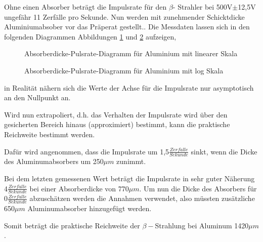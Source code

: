 Ohne einen Absorber beträgt die Impulsrate für den $\beta$- Strahler
bei 500V$\pm$12,5V ungefähr 11 Zerfälle pro Sekunde. Nun werden mit
zunehmender Schicktdicke Aluminiumabsober vor das Präperat gestellt..
Die Messdaten lassen sich in den folgenden Diagrammen Abbildungen \ref{fig:alu_lin} und \ref{fig:alu_log} aufzeigen,

\begin{figure}[h!]
\centering

\caption{Absorberdicke-Pulsrate-Diagramm für Aluminium mit linearer Skala}
\label{fig:alu_lin}
\end{figure}

\begin{figure}[h!]
\centering

\caption{Absorberdicke-Pulsrate-Diagramm für Aluminium mit log Skala}
\label{fig:alu_log}
\end{figure}

in Realität nähern sich die Werte der Achse für die Impulsrate nur
asymptotisch an den Nullpunkt an.

Wird nun extrapoliert, d.h. das Verhalten der Impulsrate wird über
den gesicherten Bereich hinaus (approximiert) bestimmt, kann die praktische
Reichweite bestimmt werden. 

Dafür wird angenommen, dass die Impulsrate um 1,5$\frac{Zerf\ddot{a}lle}{Sekunde}$
sinkt, wenn die Dicke des Aluminumabsorbers um 250$\mu m$ zunimmt. 

Bei dem letzten gemessenen Wert beträgt die Impulsrate in sehr guter
Näherung 4$\frac{Zerf\ddot{a}lle}{Sekunde}$ bei einer Absorberdicke
von 770$\mu m$. Um nun die Dicke des Absorbers für 0$\frac{Zerf\ddot{a}lle}{Sekunde}$
abzuschätzen werden die Annahmen verwendet, also müssten zusätzliche
650$\mu m$ Aluminumabsorber hinzugefügt werden.

Somit beträgt die praktische Reichweite der $\beta-$Strahlung bei
Aluminum 1420$\mu m$.

